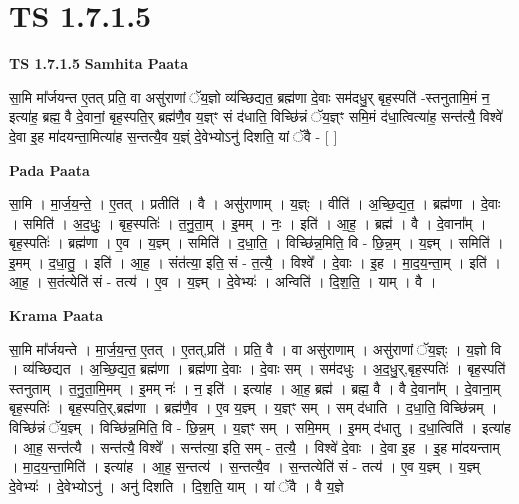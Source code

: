 \documentclass[17pt]{extarticle}
\begin{document}
\section{ TS 1.7.1.5 }

\textbf{TS 1.7.1.5 } \newline
\textbf{Samhita Paata} \newline

सा॒मि मा᳚र्जयन्त ए॒तत् प्रति॒ वा असु॑राणां ॅय॒ज्ञो व्य॑च्छिद्यत॒ ब्रह्म॑णा दे॒वाः सम॑दधु॒र् बृह॒स्पति॑ -स्तनुतामि॒मं न॒ इत्या॑ह॒ ब्रह्म॒ वै दे॒वानां॒ बृह॒स्पति॒र् ब्रह्म॑णै॒व य॒ज्ञ्ꣳ सं द॑धाति॒ विच्छि॑न्नं ॅय॒ज्ञ्ꣳ समि॒मं द॑धा॒त्वित्या॑ह॒ सन्त॑त्यै॒ विश्वे॑ दे॒वा इ॒ह मा॑दयन्ता॒मित्या॑ह स॒न्तत्यै॒व य॒ज्ञ्ं दे॒वेभ्योऽनु॑ दिशति॒ यां ॅवै - [ ] \newline

\textbf{Pada Paata} \newline

सा॒मि । मा॒र्ज॒य॒न्ते॒ । ए॒तत् । प्रतीति॑ । वै । असु॑राणाम् । य॒ज्ञ्ः । वीति॑ । अ॒च्छि॒द्य॒त॒ । ब्रह्म॑णा । दे॒वाः । समिति॑ । अ॒द॒धुः॒ । बृह॒स्पतिः॑ । त॒नु॒ता॒म् । इ॒मम् । नः॒ । इति॑ । आ॒ह॒ । ब्रह्म॑ । वै । दे॒वाना᳚म् । बृह॒स्पतिः॑ । ब्रह्म॑णा । ए॒व । य॒ज्ञ्म् । समिति॑ । द॒धा॒ति॒ । विच्छि॑न्न॒मिति॒ वि - छि॒न्न॒म् । य॒ज्ञ्म् । समिति॑ । इ॒मम् । द॒धा॒तु॒ । इति॑ । आ॒ह॒ । संत॑त्या॒ इति॒ सं - त॒त्यै॒ । विश्वे᳚ । दे॒वाः । इ॒ह । मा॒द॒य॒न्ता॒म् । इति॑ । आ॒ह॒ । स॒तंत्येति॑ सं - तत्य॑ । ए॒व । य॒ज्ञ्म् । दे॒वेभ्यः॑ । अन्विति॑ । दि॒श॒ति॒ । याम् । वै ।  \newline


\textbf{Krama Paata} \newline

सा॒मि मा᳚र्जयन्ते । मा॒र्ज॒य॒न्त॒ ए॒तत् । ए॒तत्,प्रति॑ । प्रति॒ वै । वा असु॑राणाम् । असु॑राणां ॅय॒ज्ञ्ः । य॒ज्ञो वि । व्य॑च्छिद्यत । अ॒च्छि॒द्य॒त॒ ब्रह्म॑णा । ब्रह्म॑णा दे॒वाः । दे॒वाः सम् । सम॑दधुः । अ॒द॒धु॒र्,बृह॒स्पतिः॑ । बृह॒स्पति॑ स्तनुताम् । त॒नु॒ता॒मि॒मम् । इ॒मम् नः॑ । न॒ इति॑ । इत्या॑ह । आ॒ह॒ ब्रह्म॑ । ब्रह्म॒ वै । वै दे॒वाना᳚म् । दे॒वाना॒म् बृह॒स्पतिः॑ । बृह॒स्पति॒र्,ब्रह्म॑णा । ब्रह्म॑णै॒व । ए॒व य॒ज्ञ्म् । य॒ज्ञ्ꣳ सम् । सम् द॑धाति । द॒धा॒ति॒ विच्छि॑न्नम् । विच्छि॑न्नं ॅय॒ज्ञ्म् । विच्छि॑न्न॒मिति॒ वि - छि॒न्न॒म् । य॒ज्ञ्ꣳ सम् । समि॒मम् । इ॒मम् द॑धातु । द॒धा॒त्विति॑ । इत्या॑ह । आ॒ह॒ सन्त॑त्यै । सन्त॑त्यै॒ विश्वे᳚ । सन्त॑त्या॒ इति॒ सम् - त॒त्यै॒ । विश्वे॑ दे॒वाः । दे॒वा इ॒ह । इ॒ह मा॑दयन्ताम् । मा॒द॒य॒न्ता॒मिति॑ । इत्या॑ह । आ॒ह॒ स॒न्तत्य॑ । स॒न्तत्यै॒व । स॒न्तत्येति॑ सं - तत्य॑ । ए॒व य॒ज्ञ्म् । य॒ज्ञ्म् दे॒वेभ्यः॑ । दे॒वेभ्योऽनु॑ । अनु॑ दिशति । दि॒श॒ति॒ याम् । यां ॅवै । वै य॒ज्ञे \newline
\end{document}
